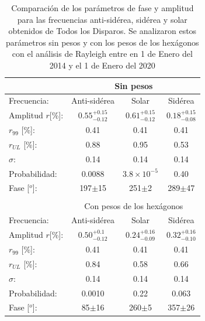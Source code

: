 		\begin{table}[H]
		\centering
		\begin{tabular}{rc|c|c|}
			\cline{2-4}
			\multicolumn{1}{r|}{} & \multicolumn{3}{c|}{Sin pesos} 							 \\ \hline
			\multicolumn{1}{|l|}{Frecuencia:   }    & Anti-sidérea          & Solar          				& Sidérea     	 \\ \hline
			\multicolumn{1}{|l|}{Amplitud $r$[\%]:} & $0.55^{+0.15}_{-0.12}$& $0.61^{+0.15}_{-0.12}$        & $0.18^{+0.15}_{-0.08}$ \\
			\multicolumn{1}{|l|}{$r_{99}$ [\%]:   } & 0.41                  & 0.41                          & 0.41       \\
			\multicolumn{1}{|l|}{$r_{UL}$ [\%]:   } & 0.88                  & 0.95                          & 0.53       \\
			\multicolumn{1}{|l|}{$\sigma$:        } & 0.14                  & 0.14                          & 0.14          \\\hline
			\multicolumn{1}{|l|}{Probabilidad:    } & 0.0088                & $3.8\times 10^{-5}$                          & 0.40          \\
			\multicolumn{1}{|l|}{Fase [$^o$]:            } & 197$\pm$15            & 251$\pm$2                    & 289$\pm$47    \\\hline \\   \cline{2-4}
			
			\multicolumn{1}{r|}{} & \multicolumn{3}{c|}{Con pesos de los hexágonos} \\ \hline
			\multicolumn{1}{|l|}{Frecuencia:      } & Anti-sidérea          & Solar        	 				& Sidérea        \\ \hline
			\multicolumn{1}{|l|}{Amplitud $r$[\%]:} & $0.50^{+0.1}_{-0.12}$& $0.24^{+0.16}_{-0.09}$        & $0.32^{+0.16}_{-0.10}$ \\
			\multicolumn{1}{|l|}{$r_{99}$ [\%]:   } & 0.41                  & 0.41                          & 0.41       \\
			\multicolumn{1}{|l|}{$r_{UL}$ [\%]:   } & 0.84                  & 0.58                          & 0.66       \\
			\multicolumn{1}{|l|}{$\sigma$:        } & 0.14                  & 0.14                          & 0.14          \\\hline
			\multicolumn{1}{|l|}{Probabilidad:    } & 0.0010                & 0.22                          & 0.063          \\
			\multicolumn{1}{|l|}{Fase [$^o$]:            } & 85$\pm$16             & 260$\pm$5                    & 357$\pm$26    \\\hline 		
		\end{tabular}
		\caption{Comparación de los parámetros de fase y amplitud para las frecuencias anti-sidérea, sidérea y solar obtenidos de Todos los Disparos. Se analizaron estos parámetros sin pesos y con los pesos de los hexágonos con el análisis de Rayleigh entre en 1 de Enero del 2014 y el 1 de Enero del 2020}
		\label{table:parametros_rayleigh}
		\end{table}

